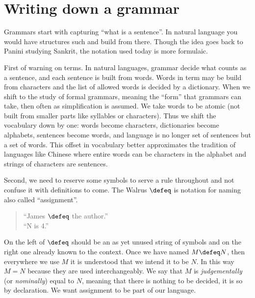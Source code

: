 \section{Writing down a grammar}
Grammars start with capturing ``what is a sentence''.  In natural 
language you would have structures such  and build 
from there.  Though the idea goes back to Panini studying Sankrit,
the notation used today is more formulaic.


First of warning on terms.  In natural languages, grammar decide what 
counts as a sentence, and each sentence is built from words.  Words in term 
may be build from characters and the list of allowed words is decided by a dictionary.
When we shift to the study of formal grammars, meaning the ``form'' that grammars can 
take, then often as simplification is assumed.  We take words to be atomic (not built 
from smaller parts like syllables or characters).  Thus we shift the vocabulary down by 
one: words become characters, dictionaries become alphabets, sentences become words, 
and language is no longer set of sentences but a set of words.
This offset in vocabulary better approximates the tradition of languages like
Chinese where entire words can be characters in the alphabet and strings of
characters are sentences.

Second, we need to reserve some symbols to serve a rule throughout and not confuse 
it with definitions to come.  The Walrus $\defeq$ is notation for naming
also called ``assignment''.
\begin{quote}
    ``James $\defeq$ the author.''\\
    ``N is 4.''
\end{quote}
On the left of $\defeq$ should be an as yet unused string of symbols and on the right 
one already known to the context.  Once we have named $M\defeq N$, then 
everywhere we use $M$ it is understood that we intend it to be $N$.
In this way $M=N$ because they are used interchangeably.  We say that 
$M$ is \emph{judgementally} (or \emph{nominally}) equal to $N$, meaning that there is 
nothing to be decided, it is so by declaration.
We want assignment to be part of our language.


